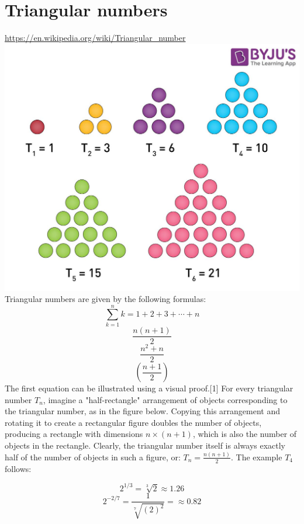 \documentclass[11pt]{article}
\begin{document}
\section{Triangular numbers}
\url{https://en.wikipedia.org/wiki/Triangular_number}\\
\includegraphics[scale=0.5]{triangular-numbers.jpg}
Triangular numbers are given by the following formulas:
\[\sum_{k=1}^{n}k=1+2+3+\cdots+n\]
\[\frac{n(n+1)}{2}\]
\[\frac{n^2+n}{2}\]
\[\left(\frac{n+1}{2}\right)\]
The first equation can be illustrated using a visual proof.[1] For every triangular number $T_{n}$, imagine a "half-rectangle" arrangement of objects corresponding to the triangular number, as in the figure below. Copying this arrangement and rotating it to create a rectangular figure doubles the number of objects, producing a rectangle with dimensions ${\displaystyle n\times (n+1)}$, which is also the number of objects in the rectangle. Clearly, the triangular number itself is always exactly half of the number of objects in such a figure, or: ${\displaystyle T_{n}={\frac {n(n+1)}{2}}}$. The example $T_4$ follows: 

\[2^{1/3}=\sqrt[3]{2}\approx 1.26\]
\[2^{-2/7}=\frac{1}{\sqrt[7]{(2)^2}}=\approx 0.82\]
\end{document}
